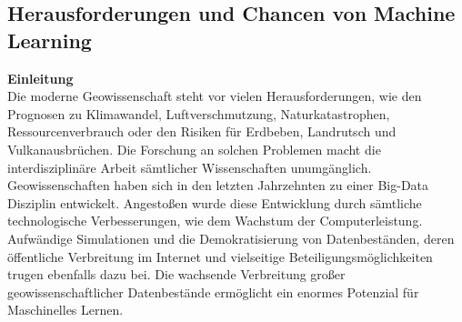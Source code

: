 \documentclass[11pt,fleqn]{book}
\begin{document}
\subsection{Herausforderungen und Chancen von Machine Learning  \cite{machgeo}}
\textbf{Einleitung}\\
Die moderne Geowissenschaft steht vor vielen Herausforderungen, wie den Prognosen zu Klimawandel, Luftverschmutzung, Naturkatastrophen, Ressourcenverbrauch oder den Risiken für Erdbeben, Landrutsch und Vulkanausbrüchen. Die Forschung an solchen Problemen macht die interdisziplinäre Arbeit sämtlicher Wissenschaften unumgänglich.
Geowissenschaften haben sich in den letzten Jahrzehnten  zu einer Big-Data Disziplin entwickelt. Angestoßen wurde diese Entwicklung durch sämtliche technologische Verbesserungen, wie dem Wachstum der Computerleistung. Aufwändige Simulationen und die Demokratisierung von Datenbeständen, deren öffentliche Verbreitung im Internet und vielseitige Beteiligungsmöglichkeiten trugen ebenfalls dazu bei. Die wachsende Verbreitung großer geowissenschaftlicher Datenbestände ermöglicht ein enormes Potenzial für Maschinelles Lernen.\\

\bigskip
\end{document}

